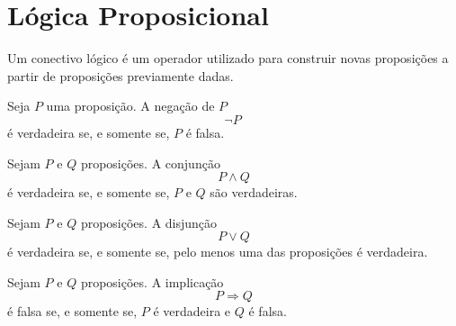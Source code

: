 \documentclass[../../main]{subfiles}
\begin{document}
\section{Lógica Proposicional}
\label{sec:matematica:logica-matematica:logica-proposicional}

\begin{defn}
	\label{def:matematica:logica-matematica:logica-proposicional:conectivo-logico}

	Um conectivo lógico é um operador utilizado para construir novas
	proposições a partir de proposições previamente dadas.
\end{defn}

\begin{defn}[Negação]
	\label{def:matematica:logica-matematica:logica-proposicional:negacao}

	Seja \(P\) uma proposição. A negação de \(P\)
	\begin{equation*}
		\neg P\
	\end{equation*}
	é verdadeira se, e somente se, \(P\) é falsa.
\end{defn}

\begin{defn}[Conjunção]
	\label{def:matematica:logica-matematica:logica-proposicional:conjuncao}

	Sejam \(P\) e \(Q\) proposições. A conjunção
	\begin{equation*}
		P \land Q
	\end{equation*}
	é verdadeira se, e somente se, \(P\) e \(Q\) são verdadeiras.
\end{defn}

\begin{defn}[Disjunção]
	\label{def:matematica:logica-matematica:logica-proposicional:disjuncao}

	Sejam \(P\) e \(Q\) proposições. A disjunção
	\begin{equation*}
		P \lor Q
	\end{equation*}
	é verdadeira se, e somente se, pelo menos uma das proposições é verdadeira.
\end{defn}

\begin{defn}[Implicação]
	\label{def:matematica:logica-matematica:logica-proposicional:implicacao}

	Sejam \(P\) e \(Q\) proposições. A implicação
	\begin{equation*}
		P \Rightarrow Q
	\end{equation*}
	é falsa se, e somente se, \(P\) é verdadeira e \(Q\) é falsa.
\end{defn}
\end{document}
